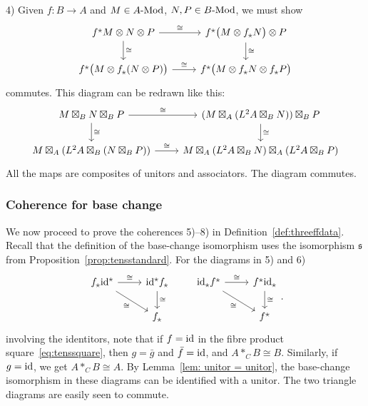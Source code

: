 \documentclass[10pt,a4paper,oneside]{amsart}
\theoremstyle{remark}
\theoremstyle{definition}
\newcommand{\lmod}[1]{#1\textnormal{-Mod}}
\newcommand{\rar}{\rightarrow}
\newcommand{\id}{\textnormal{id}}
\newcommand{\Ltwomap}{\mathfrak{s}}
\newcommand{\vn}[1]{{#1}}
\newcommand{\res}[1]{#1^{\tikz[baseline=-1]{
\draw (0,0) -- (90:.07) (0,0) -- (162:.07) (0,0) -- (234:.07) (0,0) -- (306:.07)(0,0) -- (378:.07);
}}}
\newcommand{\vnres}[1]{\res{\vn{#1}}}
\newcommand{\ind}[1]{#1_{\tikz[baseline=-1]{
\draw (0,0) -- (90:.07) (0,0) -- (162:.07) (0,0) -- (234:.07) (0,0) -- (306:.07)(0,0) -- (378:.07);
}}}
\begin{document}
4) Given $\vn{f}\colon B\rar A$ and $M\in \lmod{A}$, $N,P\in \lmod{B}$, we must show
\[
\begin{tikzcd}
    \vnres{f}M\otimes N \otimes P \arrow[r,"\cong"]\arrow[d,"\cong"]& \vnres{f}\big(M \otimes \ind{f}N \big)\otimes P \arrow[d,"\cong"]\\
    \vnres{f}\big(M \otimes \ind{f}(N\otimes P)\big) \arrow[r,"\cong"]& \vnres{f}\big(M \otimes \ind{f}N \otimes \ind{f}P \big)
\end{tikzcd}
\]
commutes. This diagram can be redrawn like this:
\[
\begin{tikzcd}
    M\boxtimes_B N \boxtimes_B P \arrow[r,"\cong"]\arrow[d,"\cong"]& (M \boxtimes_A (L^2A\boxtimes_B N) )\boxtimes_B P \arrow[d,"\cong"]\\
    M \boxtimes_A (L^2A\boxtimes_B (N\boxtimes_B P)) \arrow[r,"\cong"]& M \boxtimes_A (L^2A\boxtimes_BN) \boxtimes_A(L^2A\boxtimes_BP) 
\end{tikzcd}
\]
All the maps are composites of unitors and associators. The diagram commutes.


\subsubsection{Coherence for base change}
We now proceed to prove the coherences 
5)--8) in Definition~\ref{def:threeffdata}.
Recall that the definition of the base-change isomorphism uses the isomorphism $\Ltwomap$ from Proposition~\ref{prop:tensstandard}. For the diagrams in 5) and 6)
\[
\begin{tikzcd}
    \ind{f} \vnres{\id} \arrow[r,"\cong"]\arrow[dr,"\cong"']&\vnres{\id}\ind{f}  \arrow[d,"\cong"]\\ & \ind{f}
\end{tikzcd}\qquad
\begin{tikzcd}
    \ind{\id} \vnres{f} \arrow[r,"\cong"]\arrow[dr,"\cong"']& \vnres{f}\ind{\id} \arrow[d,"\cong"]\\ & \vnres{f}
\end{tikzcd}.
\]
involving the identitors, note that if $\vn{f}=\id$ in the fibre product square~\eqref{eq:tenssquare}, then $\vn{g}=\vn{\bar{g}}$ and $\vn{\bar{f}}=\id$, and $A\ast_{C}B\cong B$. Similarly, if $\vn{g}=\id$, we get $A\ast_{C}B\cong A$. By Lemma~\ref{lem: unitor = unitor}, the base-change isomorphism in these diagrams can be identified with a unitor. The two triangle diagrams are easily seen to commute.
\end{document}

